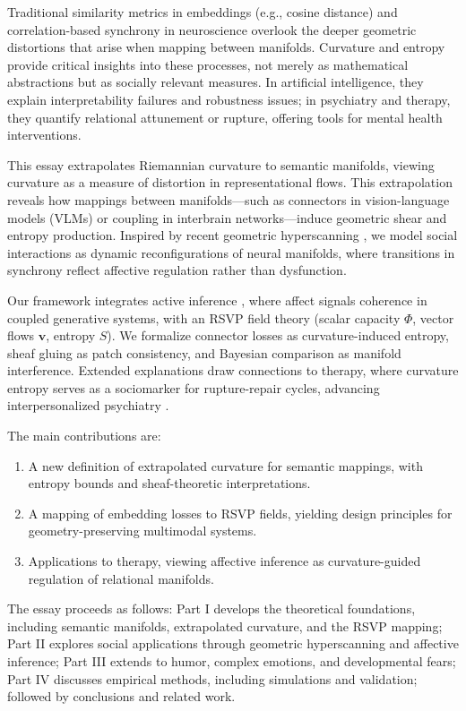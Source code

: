 \documentclass{article}
\theoremstyle{definition}
\begin{document}
Traditional similarity metrics in embeddings (e.g., cosine distance) and correlation-based synchrony in neuroscience overlook the deeper geometric distortions that arise when mapping between manifolds. Curvature and entropy provide critical insights into these processes, not merely as mathematical abstractions but as socially relevant measures. In artificial intelligence, they explain interpretability failures and robustness issues; in psychiatry and therapy, they quantify relational attunement or rupture, offering tools for mental health interventions.

This essay extrapolates Riemannian curvature to semantic manifolds, viewing curvature as a measure of distortion in representational flows. This extrapolation reveals how mappings between manifolds—such as connectors in vision-language models (VLMs) or coupling in interbrain networks—induce geometric shear and entropy production. Inspired by recent geometric hyperscanning \cite{hinrichs2025geometry}, we model social interactions as dynamic reconfigurations of neural manifolds, where transitions in synchrony reflect affective regulation rather than dysfunction.

Our framework integrates active inference \cite{friston2017graphical}, where affect signals coherence in coupled generative systems, with an RSVP field theory (scalar capacity $\Phi$, vector flows $\mathbf{v}$, entropy $S$). We formalize connector losses as curvature-induced entropy, sheaf gluing as patch consistency, and Bayesian comparison as manifold interference. Extended explanations draw connections to therapy, where curvature entropy serves as a sociomarker for rupture-repair cycles, advancing interpersonalized psychiatry \cite{adel2025systematic}.

The main contributions are:
\begin{enumerate}
  \item A new definition of extrapolated curvature for semantic mappings, with entropy bounds and sheaf-theoretic interpretations.
  \item A mapping of embedding losses to RSVP fields, yielding design principles for geometry-preserving multimodal systems.
  \item Applications to therapy, viewing affective inference as curvature-guided regulation of relational manifolds.
\end{enumerate}

The essay proceeds as follows: Part I develops the theoretical foundations, including semantic manifolds, extrapolated curvature, and the RSVP mapping; Part II explores social applications through geometric hyperscanning and affective inference; Part III extends to humor, complex emotions, and developmental fears; Part IV discusses empirical methods, including simulations and validation; followed by conclusions and related work.
\end{document}
